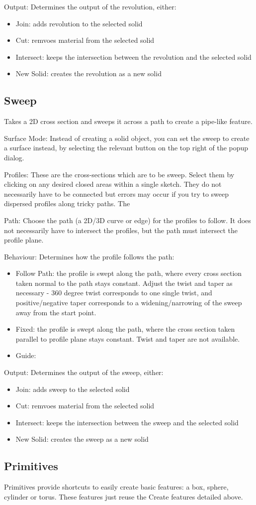 Output:
Determines the output of the revolution, either:
\begin{itemize}
    \item Join: adds revolution to the selected solid
    \item Cut: remvoes material from the selected solid
    \item Intersect: keeps the intersection between the revolution and the selected solid
    \item New Solid: creates the revolution as a new solid
\end{itemize}

\subsection{Sweep}
Takes a 2D cross section and sweeps it across a path to create a pipe-like feature.

Surface Mode:
Instead of creating a solid object, you can set the sweep to create a surface instead, by selecting the relevant button on the top right of the popup dialog.

Profiles:
These are the cross-sections which are to be sweep. Select them by clicking on any desired closed areas within a single sketch. They do not necessarily have to be connected but errors may occur if you try to sweep dispersed profiles along tricky paths. The

Path:
Choose the path (a 2D/3D curve or edge) for the profiles to follow. It does not necessarily have to intersect the profiles, but the path must intersect the profile plane.

Behaviour:
Determines how the profile follows the path:

\begin{itemize}
    \item Follow Path: the profile is swept along the path, where every cross section taken normal to the path stays constant. Adjust the twist and taper as necessary - 360 degree twist corresponds to one single twist, and positive/negative taper corresponds to a widening/narrowing of the sweep away from the start point.
    \item Fixed: the profile is swept along the path, where the cross section taken parallel to profile plane stays constant. Twist and taper are not available.
    \item Guide: 
\end{itemize}


Output:
Determines the output of the sweep, either:
\begin{itemize}
    \item Join: adds sweep to the selected solid
    \item Cut: remvoes material from the selected solid
    \item Intersect: keeps the intersection between the sweep and the selected solid
    \item New Solid: creates the sweep as a new solid
\end{itemize}



\subsection{Primitives}
Primitives provide shortcuts to easily create basic features: a box, sphere, cylinder or torus. These features just reuse the Create features detailed above.